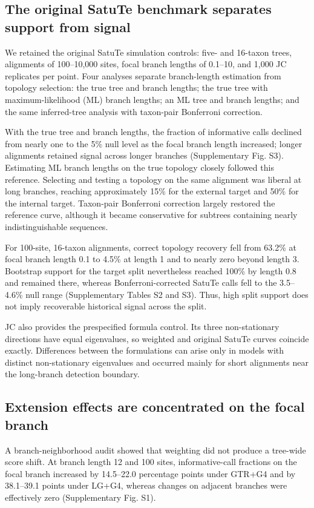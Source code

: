 \subsection*{The original SatuTe benchmark separates support from signal}

We retained the original SatuTe simulation controls: five- and 16-taxon trees, alignments of 100--10,000 sites, focal branch lengths of 0.1--10, and 1,000 JC replicates per point. Four analyses separate branch-length estimation from topology selection: the true tree and branch lengths; the true tree with maximum-likelihood (ML) branch lengths; an ML tree and branch lengths; and the same inferred-tree analysis with taxon-pair Bonferroni correction.

With the true tree and branch lengths, the fraction of informative calls declined from nearly one to the 5\% null level as the focal branch length increased; longer alignments retained signal across longer branches (Supplementary Fig. S3). Estimating ML branch lengths on the true topology closely followed this reference. Selecting and testing a topology on the same alignment was liberal at long branches, reaching approximately 15\% for the external target and 50\% for the internal target. Taxon-pair Bonferroni correction largely restored the reference curve, although it became conservative for subtrees containing nearly indistinguishable sequences.

For 100-site, 16-taxon alignments, correct topology recovery fell from 63.2\% at focal branch length 0.1 to 4.5\% at length 1 and to nearly zero beyond length 3. Bootstrap support for the target split nevertheless reached 100\% by length 0.8 and remained there, whereas Bonferroni-corrected SatuTe calls fell to the 3.5--4.6\% null range (Supplementary Tables S2 and S3). Thus, high split support does not imply recoverable historical signal across the split.

JC also provides the prespecified formula control. Its three non-stationary directions have equal eigenvalues, so weighted and original SatuTe curves coincide exactly. Differences between the formulations can arise only in models with distinct non-stationary eigenvalues and occurred mainly for short alignments near the long-branch detection boundary.

\subsection*{Extension effects are concentrated on the focal branch}

A branch-neighborhood audit showed that weighting did not produce a tree-wide score shift. At branch length 12 and 100 sites, informative-call fractions on the focal branch increased by 14.5--22.0 percentage points under GTR+G4 and by 38.1--39.1 points under LG+G4, whereas changes on adjacent branches were effectively zero (Supplementary Fig. S1).
